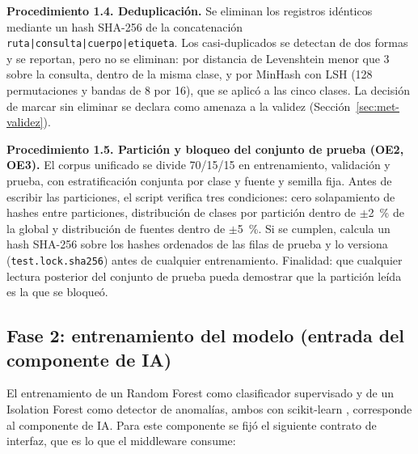 \textbf{Procedimiento 1.4. Deduplicación.} Se eliminan los registros idénticos mediante un hash
SHA-256 de la concatenación \texttt{ruta|consulta|cuerpo|etiqueta}. Los casi-duplicados
se detectan de dos formas y se reportan, pero no se eliminan: por distancia de Levenshtein \cite{levenshtein1966binary} menor
que 3 sobre la consulta, dentro de la misma clase, y por MinHash \cite{broder1997resemblance} con LSH \cite{indyk1998approximate} (128 permutaciones y
bandas de 8 por 16), que se aplicó a las cinco clases. La decisión de marcar sin eliminar se
declara como amenaza a la validez (Sección~\ref{sec:met-validez}).

\textbf{Procedimiento 1.5. Partición y bloqueo del conjunto de prueba (OE2, OE3).} El corpus
unificado se divide 70/15/15 en entrenamiento, validación y prueba, con estratificación conjunta
por clase y fuente y semilla fija. Antes de escribir las particiones, el script verifica tres
condiciones: cero solapamiento de hashes entre particiones, distribución de clases por partición
dentro de $\pm$2~\% de la global y distribución de fuentes dentro de $\pm$5~\%. Si se cumplen,
calcula un hash SHA-256 sobre los hashes ordenados de las filas de prueba y lo versiona
(\texttt{test.lock.sha256}) antes de cualquier entrenamiento. Finalidad: que cualquier lectura
posterior del conjunto de prueba pueda demostrar que la partición leída es la que se bloqueó.

\subsection{Fase 2: entrenamiento del modelo (entrada del componente de IA)}
\label{subsec:met-f2}

El entrenamiento de un Random Forest como clasificador supervisado y de un Isolation Forest como
detector de anomalías, ambos con scikit-learn \cite{pedregosa2011}, corresponde al componente de
IA. Para este componente se fijó el siguiente contrato de interfaz, que es lo que el middleware
consume:

